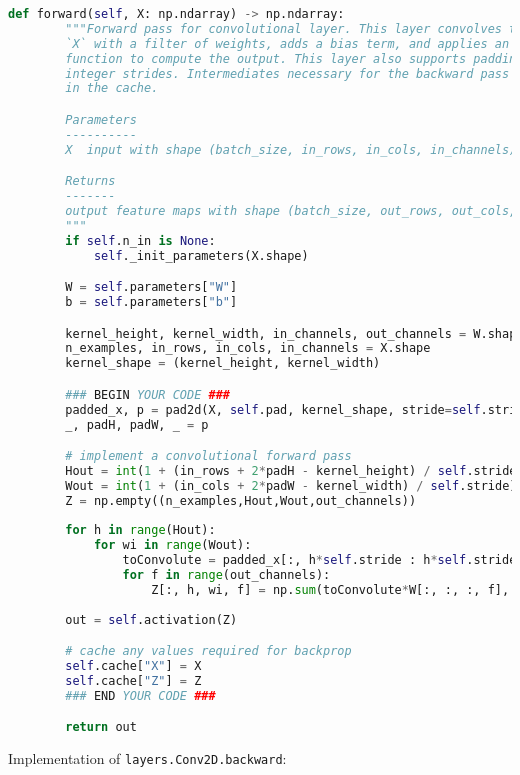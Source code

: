 \begin{lstlisting}[language=Python]
    def forward(self, X: np.ndarray) -> np.ndarray:
        """Forward pass for convolutional layer. This layer convolves the input
        `X` with a filter of weights, adds a bias term, and applies an activation
        function to compute the output. This layer also supports padding and
        integer strides. Intermediates necessary for the backward pass are stored
        in the cache.

        Parameters
        ----------
        X  input with shape (batch_size, in_rows, in_cols, in_channels)

        Returns
        -------
        output feature maps with shape (batch_size, out_rows, out_cols, out_channels)
        """
        if self.n_in is None:
            self._init_parameters(X.shape)

        W = self.parameters["W"]
        b = self.parameters["b"]

        kernel_height, kernel_width, in_channels, out_channels = W.shape
        n_examples, in_rows, in_cols, in_channels = X.shape
        kernel_shape = (kernel_height, kernel_width)

        ### BEGIN YOUR CODE ###
        padded_x, p = pad2d(X, self.pad, kernel_shape, stride=self.stride)
        _, padH, padW, _ = p

        # implement a convolutional forward pass
        Hout = int(1 + (in_rows + 2*padH - kernel_height) / self.stride)
        Wout = int(1 + (in_cols + 2*padW - kernel_width) / self.stride)
        Z = np.empty((n_examples,Hout,Wout,out_channels))
        
        for h in range(Hout):
            for wi in range(Wout):
                toConvolute = padded_x[:, h*self.stride : h*self.stride+kernel_height, wi*self.stride : wi*self.stride+kernel_width, :]
                for f in range(out_channels):
                    Z[:, h, wi, f] = np.sum(toConvolute*W[:, :, :, f], axis=(1,2,3)) + b[0, f]
                    
        out = self.activation(Z)

        # cache any values required for backprop
        self.cache["X"] = X
        self.cache["Z"] = Z
        ### END YOUR CODE ###

        return out

\end{lstlisting}

Implementation of \texttt{layers.Conv2D.backward}:

